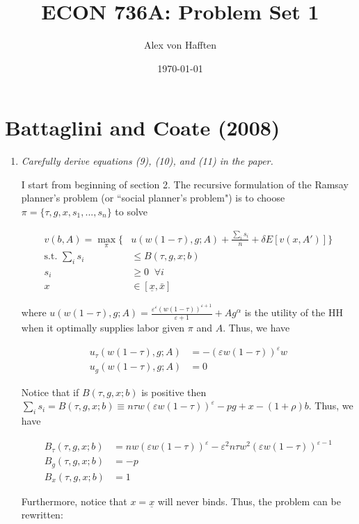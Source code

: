 \documentclass{article}
\title{ECON 736A: Problem Set 1}
\author{Alex von Hafften}
\date{\today}
\begin{document}
\maketitle

\section{Battaglini and Coate (2008)}

\begin{enumerate}

\item \textit{Carefully derive equations (9), (10), and (11) in the paper.}

I start from beginning of section 2. The recursive formulation of the Ramsay planner's problem (or ``social planner's problem") is to choose $\pi = \{\tau, g, x, s_1, ..., s_n\}$ to solve

\begin{align*}
v(b, A) = \max_{\pi} \Bigg\{& u(w(1-\tau), g; A) + \frac{\sum_i s_i}{n} + \delta E[v(x, A')] \Bigg\}\\
\text{s.t. } \sum_i s_i &\le B(\tau, g, x; b)\\
s_i &\ge 0 \;\; \forall i\\
x &\in [\underline x, \bar x]
\end{align*}

where  $u(w(1-\tau), g; A) = \frac{\varepsilon^\varepsilon(w(1-\tau))^{\varepsilon + 1}}{\varepsilon + 1} + Ag^\alpha$ is the utility of the HH when it optimally supplies labor given $\pi$ and $A$. Thus, we have

\begin{align*}
u_\tau(w(1-\tau), g; A) &= - (\varepsilon w(1-\tau))^\varepsilon w\\
u_g(w(1-\tau), g; A ) &= 0
\end{align*}

Notice that if $B(\tau, g, x; b)$ is positive then $\sum_i s_i = B(\tau, g, x; b) \equiv n \tau w(\varepsilon w(1-\tau))^\varepsilon - pg + x - (1+\rho)b$. Thus, we have

\begin{align*}
B_\tau (\tau, g, x; b) &= n w(\varepsilon w(1-\tau))^\varepsilon - \varepsilon^2 n \tau w^2(\varepsilon w(1-\tau))^{\varepsilon-1} \\
B_g (\tau, g, x; b) &= - p\\
B_x (\tau, g, x; b) &= 1
\end{align*}

Furthermore, notice that $x = \underline x$ will never binds. Thus, the problem can be rewritten:


\end{enumerate}
\end{document}
